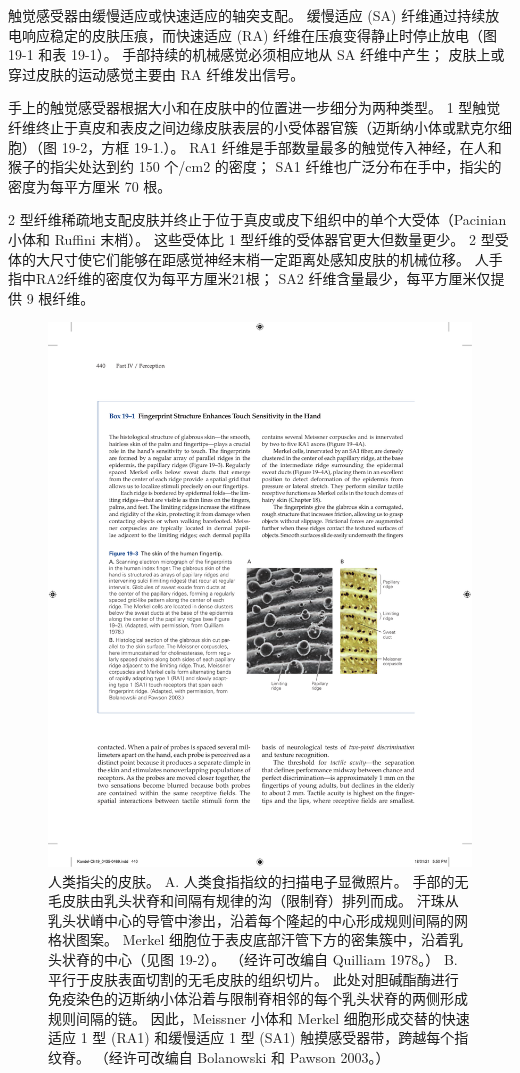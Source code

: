 触觉感受器由缓慢适应或快速适应的轴突支配。 缓慢适应 (SA) 纤维通过持续放电响应稳定的皮肤压痕，而快速适应 (RA) 纤维在压痕变得静止时停止放电（图 19-1 和表 19-1）。 手部持续的机械感觉必须相应地从 SA 纤维中产生； 皮肤上或穿过皮肤的运动感觉主要由 RA 纤维发出信号。

手上的触觉感受器根据大小和在皮肤中的位置进一步细分为两种类型。 1 型触觉纤维终止于真皮和表皮之间边缘皮肤表层的小受体器官簇（迈斯纳小体或默克尔细胞）（图 19-2，方框 19-1.）。 RA1 纤维是手部数量最多的触觉传入神经，在人和猴子的指尖处达到约 150 个/cm2 的密度； SA1 纤维也广泛分布在手中，指尖的密度为每平方厘米 70 根。

2 型纤维稀疏地支配皮肤并终止于位于真皮或皮下组织中的单个大受体（Pacinian 小体和 Ruffini 末梢）。 这些受体比 1 型纤维的受体器官更大但数量更少。 2 型受体的大尺寸使它们能够在距感觉神经末梢一定距离处感知皮肤的机械位移。 人手指中RA2纤维的密度仅为每平方厘米21根； SA2 纤维含量最少，每平方厘米仅提供 9 根纤维。

\begin{figure}[htbp]
	\centering
	\includegraphics[width=0.5\linewidth]{chap19/fig_19_3}
	\caption{人类指尖的皮肤。 
		A. 人类食指指纹的扫描电子显微照片。 
		手部的无毛皮肤由乳头状脊和间隔有规律的沟（限制脊）排列而成。 
		汗珠从乳头状嵴中心的导管中渗出，沿着每个隆起的中心形成规则间隔的网格状图案。 
		Merkel 细胞位于表皮底部汗管下方的密集簇中，沿着乳头状脊的中心（见图 19-2）。
		 （经许可改编自 Quilliam 1978。） 
		 B. 平行于皮肤表面切割的无毛皮肤的组织切片。 此处对胆碱酯酶进行免疫染色的迈斯纳小体沿着与限制脊相邻的每个乳头状脊的两侧形成规则间隔的链。 
		 因此，Meissner 小体和 Merkel 细胞形成交替的快速适应 1 型 (RA1) 和缓慢适应 1 型 (SA1) 触摸感受器带，跨越每个指纹脊。 （经许可改编自 Bolanowski 和 Pawson 2003。）}
	\label{fig:19_3}
\end{figure}


